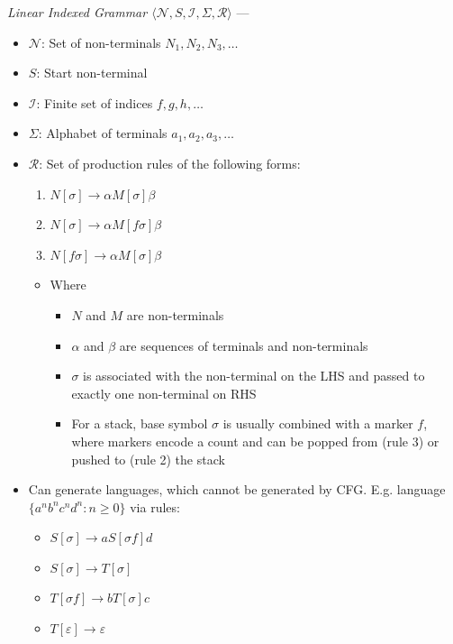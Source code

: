 \emph{Linear Indexed Grammar $\langle \mathcal{N}, S, \mathcal{I}, \Sigma, \mathcal{R} \rangle$} --- 
\begin{itemize}
    \item $\mathcal{N}$: Set of non-terminals $N_1, N_2, N_3, \dots$
    \item $S$: Start non-terminal
    \item $\mathcal{I}$: Finite set of indices $f, g, h, \dots$
    \item $\Sigma$: Alphabet of terminals $a_1, a_2, a_3, \dots$
    \item $\mathcal{R}$: Set of production rules of the following forms:
    \begin{enumerate}
        \item $N[\sigma] \to \alpha M[\sigma]\beta$
        \item $N[\sigma] \to \alpha M[f\sigma]\beta$
        \item $N[f\sigma] \to \alpha M[\sigma]\beta$
    \end{enumerate}
    \begin{itemize}
        \item Where
        \begin{itemize}
            \item $N$ and $M$ are non-terminals
            \item $\alpha$ and $\beta$ are sequences of terminals and non-terminals
            \item $\sigma$ is associated with the non-terminal on the LHS and passed to exactly one non-terminal on RHS
            \item For a stack, base symbol $\sigma$ is usually combined with a marker $f$, where markers encode a count and can be popped from (rule 3) or pushed to (rule 2) the stack
        \end{itemize}
    \end{itemize}
    \item Can generate languages, which cannot be generated by CFG. E.g. language $\{a^n b^n c^n d^n : n \geq 0\}$ via rules:
    \begin{itemize}
        \item $S[\sigma] \to aS[\sigma f]d$
        \item $S[\sigma] \to T[\sigma]$
        \item $T[\sigma f] \to bT[\sigma]c$
        \item $T[\varepsilon] \to \varepsilon$
    \end{itemize} 
\end{itemize}

